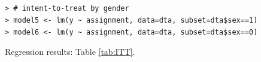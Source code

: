 \documentclass[a4paper]{article}
\begin{document}

\subsection{}

\begin{verbatim}
> # intent-to-treat by gender
> model5 <- lm(y ~ assignment, data=dta, subset=dta$sex==1)
> model6 <- lm(y ~ assignment, data=dta, subset=dta$sex==0)
\end{verbatim}

Regression results: Table \ref{tab:ITT}.
\end{document}
